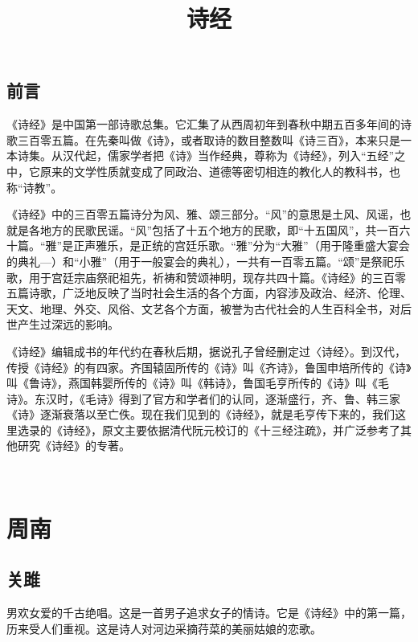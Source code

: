 \documentclass[12pt,UTF8]{ctexbook}
\title{\heiti\zihao{0} 诗经}
\author{}
\date{}
\begin{document}
\maketitle
\tableofcontents

\frontmatter
\chapter{前言}
《诗经》是中国第一部诗歌总集。它汇集了从西周初年到春秋中期五百多年间的诗歌三百零五篇。在先秦叫做《诗》，或者取诗的数目整数叫《诗三百》，本来只是一本诗集。从汉代起，儒家学者把《诗》当作经典，尊称为《诗经》，列入“五经”之中，它原来的文学性质就变成了同政治、道德等密切相连的教化人的教科书，也称“诗教”。

《诗经》中的三百零五篇诗分为风、雅、颂三部分。“风”的意思是土风、风谣，也就是各地方的民歌民谣。“风”包括了十五个地方的民歌，即“十五国风”，共一百六十篇。“雅”是正声雅乐，是正统的宫廷乐歌。“雅”分为“大雅”（用于隆重盛大宴会的典礼—）和“小雅”（用于一般宴会的典礼），一共有一百零五篇。“颂”是祭祀乐歌，用于宫廷宗庙祭祀祖先，祈祷和赞颂神明，现存共四十篇。《诗经》的三百零五篇诗歌，广泛地反映了当时社会生活的各个方面，内容涉及政治、经济、伦理、天文、地理、外交、风俗、文艺各个方面，被誉为古代社会的人生百科全书，对后世产生过深远的影响。

《诗经》编辑成书的年代约在春秋后期，据说孔子曾经删定过〈诗经〉。到汉代，传授《诗经》的有四家。齐国辕固所传的《诗》叫《齐诗》，鲁国申培所传的《诗》叫《鲁诗》，燕国韩婴所传的《诗》叫《韩诗》，鲁国毛亨所传的《诗》叫《毛诗》。东汉时，《毛诗》得到了官方和学者们的认同，逐渐盛行，齐、鲁、韩三家《诗》逐渐衰落以至亡佚。现在我们见到的《诗经》，就是毛亨传下来的，我们这里选录的《诗经》，原文主要依据清代阮元校订的《十三经注疏》，并广泛参考了其他研究《诗经》的专著。

\mainmatter

~\\

 \qquad  

\part{周南}

\chapter{关雎}
男欢女爱的千古绝唱。这是一首男子追求女子的情诗。它是《诗经》中的第一篇，历来受人们重视。这是诗人对河边采摘荇菜的美丽姑娘的恋歌。
\end{document}

